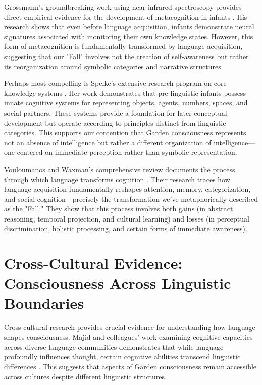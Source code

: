 Grossmann's groundbreaking work using near-infrared spectroscopy provides direct empirical evidence for the development of metacognition in infants \parencite{grossmann2023development}. His research shows that even before language acquisition, infants demonstrate neural signatures associated with monitoring their own knowledge states. However, this form of metacognition is fundamentally transformed by language acquisition, suggesting that our "Fall" involves not the creation of self-awareness but rather its reorganization around symbolic categories and narrative structures.

Perhaps most compelling is Spelke's extensive research program on core knowledge systems \parencite{spelke2024core}. Her work demonstrates that pre-linguistic infants possess innate cognitive systems for representing objects, agents, numbers, spaces, and social partners. These systems provide a foundation for later conceptual development but operate according to principles distinct from linguistic categories. This supports our contention that Garden consciousness represents not an absence of intelligence but rather a different organization of intelligence—one centered on immediate perception rather than symbolic representation.

Vouloumanos and Waxman's comprehensive review documents the process through which language transforms cognition \parencite{vouloumanos2022language}. Their research traces how language acquisition fundamentally reshapes attention, memory, categorization, and social cognition—precisely the transformation we've metaphorically described as the "Fall." They show that this process involves both gains (in abstract reasoning, temporal projection, and cultural learning) and losses (in perceptual discrimination, holistic processing, and certain forms of immediate awareness).

\section{Cross-Cultural Evidence: Consciousness Across Linguistic Boundaries}

Cross-cultural research provides crucial evidence for understanding how language shapes consciousness. Majid and colleagues' work examining cognitive capacities across diverse language communities demonstrates that while language profoundly influences thought, certain cognitive abilities transcend linguistic differences \parencite{majid2024language}. This suggests that aspects of Garden consciousness remain accessible across cultures despite different linguistic structures.

